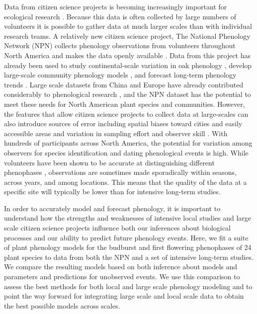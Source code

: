 \documentclass[fleqn,10pt,lineno]{wlpeerj} %
\begin{document}
Data from citizen science projects is becoming increasingly important for ecological research \citep{kelling2009, dickinson2010, tulloch2013}. Because this data is often collected by large numbers of volunteers it is possible to gather data at much larger scales than with individual research teams. A relatively new citizen science project, The National Phenology Network (NPN) collects phenology observations from volunteers throughout North America and makes the data openly available \citep{schwartz2012a}. Data from this project has already been used to study continental-scale variation in oak phenology \citep{gerst2017}, develop large-scale community phenology models \citep{melaas2016}, and forecast long-term phenology trends \citep{jeong2013}. Large scale datasets from China and Europe have already contributed considerably to phenological research \citep{xu2013, olsson2014, basler2016, zhang2017}, and the NPN dataset has the potential to meet these needs for North American plant species and communities. However, the features that allow citizen science projects to collect data at large-scales can also introduce sources of error including spatial biases toward cities and easily accessible areas and variation in sampling effort and observer skill \citep{dickinson2010}. With hundreds of participants across North America, the potential for variation among observers for species identification and dating phenological events is high. While volunteers have been shown to be accurate at distinguishing different phenophases \citep{fuccillo2015}, observations are sometimes made sporadically within seasons, across years, and among locations. This means that the quality of the data at a specific site will typically be lower than for intensive long-term studies.

In order to accurately model and forecast phenology, it is important to understand how the strengths and weaknesses of intensive local studies and large scale citizen science projects influence both our inferences about biological processes and our ability to predict future phenology events. Here, we fit a suite of plant phenology models for the budburst and first flowering phenophases of 24 plant species to data from both the NPN and a set of intensive long-term studies. We compare the resulting models based on both inference about models and parameters and predictions for unobserved events. We use this comparison to assess the best methods for both local and large scale phenology modeling and to point the way forward for integrating large scale and local scale data to obtain the best possible models across scales.
\end{document}
